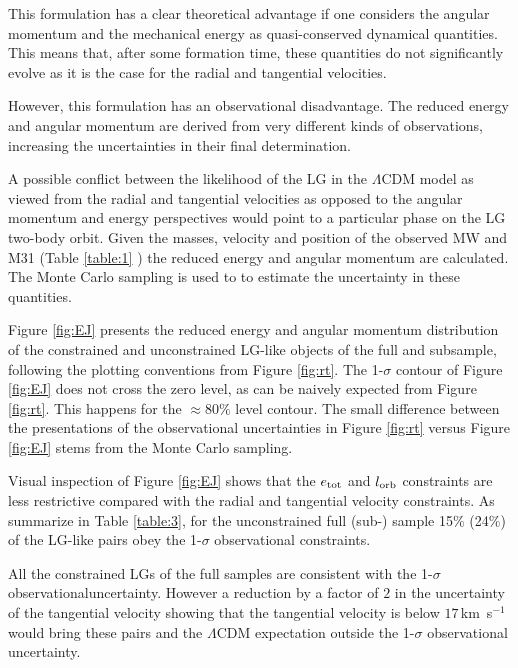 \documentclass{emulateapj}
\newcommand{\kms}{\,km~s$^{-1}$}
\begin{document}
This formulation has a clear theoretical advantage if one considers
the angular momentum and the mechanical energy as quasi-conserved
dynamical quantities. This means that, after some formation time,
these quantities do not significantly evolve as it is the case for the
radial and tangential velocities.  

However, this formulation has an observational disadvantage. The
reduced energy and angular momentum are derived from very different
kinds of observations, increasing the uncertainties in their final
determination.  

A possible conflict between the likelihood of the LG in the
$\Lambda$CDM model as viewed from the radial and tangential velocities
as opposed to the angular momentum and energy perspectives would point
to a particular phase on the LG two-body orbit. Given the masses,
velocity and position of the observed MW and M31 (Table \ref{table:1}
) the reduced energy and angular momentum are calculated. The Monte
Carlo sampling is used to to estimate the uncertainty in these
quantities.  

Figure \ref{fig:EJ} presents the reduced  energy and angular momentum
distribution of the constrained and unconstrained LG-like  objects of
the full and subsample, following the   plotting conventions from
Figure \ref{fig:rt}.  The  1-$\sigma$ contour of Figure \ref{fig:EJ}
does not cross the zero level, as can be naively expected from Figure
\ref{fig:rt}. This happens for the $\approx 80\%$ level
contour. The small difference between the presentations of the
observational uncertainties in Figure \ref{fig:rt} versus Figure
\ref{fig:EJ} stems from the Monte Carlo sampling.  

Visual inspection of Figure \ref{fig:EJ}  shows that the $e_{\rm tot}$  and
$l_{\rm orb}$ constraints are less restrictive compared with the
radial and tangential velocity constraints. As summarize in Table
\ref{table:3}, for the unconstrained full (sub-) sample 15\% (24\%)
of the LG-like pairs obey the 1-$\sigma$ observational
constraints. 

All the constrained LGs of the full samples are
consistent with the 1-$\sigma$ observationaluncertainty.  However a
reduction by a factor of $2$ in the uncertainty of the tangential
velocity showing that the tangential velocity is below $17$\kms would
bring these pairs and the $\Lambda$CDM expectation outside the 1-$\sigma$ observational uncertainty. 
\end{document}
